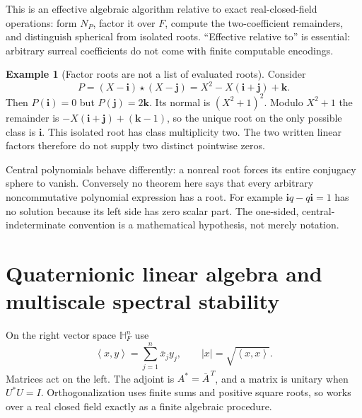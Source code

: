 \documentclass[11pt,letterpaper]{article}
\numberwithin{equation}{section}
\theoremstyle{definition}
\newtheorem{example}[example]{Example}
\theoremstyle{remark}
\newcommand{\HF}{\mathbb H_F}
\newcommand{\ii}{\mathbf i}
\newcommand{\jj}{\mathbf j}
\newcommand{\kk}{\mathbf k}
\newcommand{\angles}[1]{\left\langle#1\right\rangle}
\begin{document}
This is an effective algebraic algorithm relative to exact real-closed-field operations:
form $N_P$, factor it over $F$, compute the two-coefficient remainders, and distinguish
spherical from isolated roots. ``Effective relative to'' is essential: arbitrary surreal
coefficients do not come with finite computable encodings.

\begin{example}[Factor roots are not a list of evaluated roots]\label{ex:poly}
Consider
\[
 P=(X-\ii)\star(X-\jj)=X^2-X(\ii+\jj)+\kk.
\]
Then $P(\ii)=0$ but $P(\jj)=2\kk$. Its normal is $(X^2+1)^2$.
Modulo $X^2+1$ the remainder is $-X(\ii+\jj)+(\kk-1)$, so the unique root on the only
possible class is $\ii$. This isolated root has class multiplicity two.
The two written linear factors therefore do not supply two distinct pointwise zeros.
\end{example}

Central polynomials behave differently: a nonreal root forces its entire conjugacy sphere
to vanish. Conversely no theorem here says that every arbitrary noncommutative polynomial
expression has a root. For example $\ii q-q\ii=1$ has no solution because its left side has
zero scalar part. The one-sided, central-indeterminate convention is a mathematical
hypothesis, not merely notation.

\section{Quaternionic linear algebra and multiscale spectral stability}\label{sec:spectral}

On the right vector space $\HF^n$ use
\[
 \angles{x,y}=\sum_{j=1}^n\bar x_jy_j,
 \qquad |x|=\sqrt{\angles{x,x}}.
\]
Matrices act on the left. The adjoint is $A^*=\bar A^{\,T}$, and a matrix is unitary when
$U^*U=I$. Orthogonalization uses finite sums and positive square roots, so works over a real
closed field exactly as a finite algebraic procedure.
\end{document}
